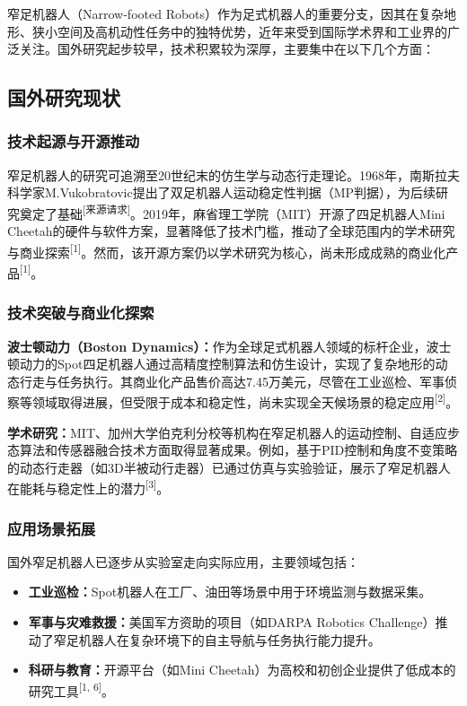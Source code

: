\documentclass[a4paper,fontset=windows]{ctexart}
\providecommand{\tightlist}{%
  \setlength{\itemsep}{0pt}\setlength{\parskip}{0pt}}
\begin{document}
窄足机器人（Narrow-footed Robots）作为足式机器人的重要分支，因其在复杂地形、狭小空间及高机动性任务中的独特优势，近年来受到国际学术界和工业界的广泛关注。国外研究起步较早，技术积累较为深厚，主要集中在以下几个方面：

\subsection{国外研究现状}
\subsubsection{技术起源与开源推动}
窄足机器人的研究可追溯至20世纪末的仿生学与动态行走理论。1968年，南斯拉夫科学家M.Vukobratovic提出了双足机器人运动稳定性判据（MP判据），为后续研究奠定了基础\textsuperscript{[来源请求]}。2019年，麻省理工学院（MIT）开源了四足机器人Mini Cheetah的硬件与软件方案，显著降低了技术门槛，推动了全球范围内的学术研究与商业探索\textsuperscript{[1]}。然而，该开源方案仍以学术研究为核心，尚未形成成熟的商业化产品\textsuperscript{[1]}。

\subsubsection{技术突破与商业化探索}
\textbf{波士顿动力（Boston Dynamics）：}作为全球足式机器人领域的标杆企业，波士顿动力的Spot四足机器人通过高精度控制算法和仿生设计，实现了复杂地形的动态行走与任务执行。其商业化产品售价高达7.45万美元，尽管在工业巡检、军事侦察等领域取得进展，但受限于成本和稳定性，尚未实现全天候场景的稳定应用\textsuperscript{[2]}。

\textbf{学术研究：}MIT、加州大学伯克利分校等机构在窄足机器人的运动控制、自适应步态算法和传感器融合技术方面取得显著成果。例如，基于PID控制和角度不变策略的动态行走器（如3D半被动行走器）已通过仿真与实验验证，展示了窄足机器人在能耗与稳定性上的潜力\textsuperscript{[3]}。

\subsubsection{应用场景拓展}
国外窄足机器人已逐步从实验室走向实际应用，主要领域包括：

\begin{itemize}
    \tightlist
    \item \textbf{工业巡检：}Spot机器人在工厂、油田等场景中用于环境监测与数据采集。
    \item \textbf{军事与灾难救援：}美国军方资助的项目（如DARPA Robotics Challenge）推动了窄足机器人在复杂环境下的自主导航与任务执行能力提升。
    \item \textbf{科研与教育：}开源平台（如Mini Cheetah）为高校和初创企业提供了低成本的研究工具\textsuperscript{[1, 6]}。
\end{itemize}
\end{document}
